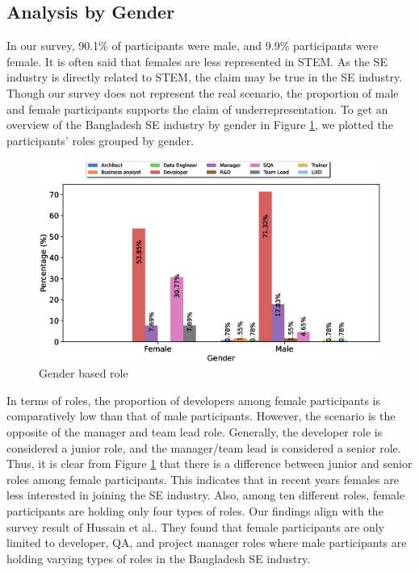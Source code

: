 \subsection{Analysis by Gender}

In our survey, 90.1\% of participants were male, and 9.9\% participants were female. It is often said that females are less represented in STEM. As the SE industry is directly related to STEM, the claim may be true in the SE industry. Though our survey does not represent the real scenario, the proportion of male and female participants supports the claim of underrepresentation. To get an overview of the Bangladesh SE industry by gender in Figure \ref{fig:gender and role}, we plotted the participants' roles grouped by gender. 
\begin{figure}[h]
\centering
  \includegraphics[scale=0.4]{Figures/Gender_and_Role}
  \caption{Gender based role}
  \label{fig:gender and role}
\end{figure}
In terms of roles, the proportion of developers among female participants is comparatively low than that of male participants. However, the scenario is the opposite of the manager and team lead role. Generally, the developer role is considered a junior role, and the manager/team lead is considered a senior role. Thus, it is clear from Figure \ref{fig:gender and role} that there is a difference between junior and senior roles among female participants. This indicates that in recent years females are less interested in joining the SE industry. Also, among ten different roles, female participants are holding only four types of roles.  Our findings align with the survey result of Hussain et al.\cite{Hussain2020}. They found that female participants are only limited to developer, QA, and project manager roles where male participants are holding varying types of roles in the Bangladesh SE industry.

